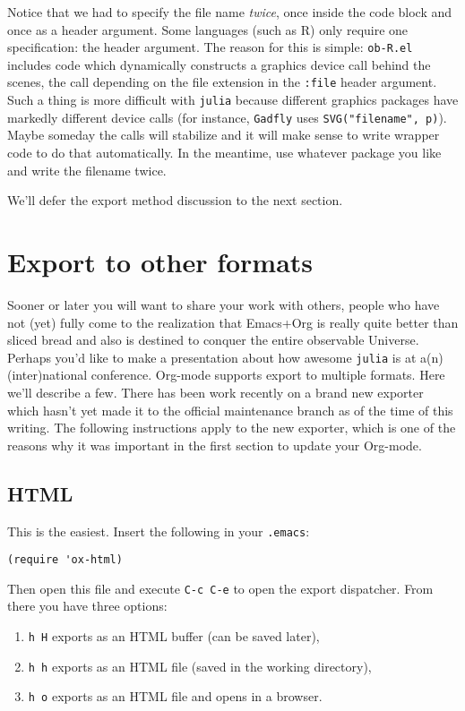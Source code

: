 \documentclass[11pt]{article}
\begin{document}
Notice that we had to specify the file name \emph{twice}, once inside the
code block and once as a header argument.  Some languages (such as R)
only require one specification: the header argument.  The reason for
this is simple: \texttt{ob-R.el} includes code which dynamically constructs a
graphics device call behind the scenes, the call depending on the file
extension in the \texttt{:file} header argument.  Such a thing is more
difficult with \texttt{julia} because different graphics packages have
markedly different device calls (for instance, \texttt{Gadfly} uses
\texttt{SVG("filename", p)}).  Maybe someday the calls will stabilize and it
will make sense to write wrapper code to do that automatically.  In
the meantime, use whatever package you like and write the filename
twice.

We'll defer the export method discussion to the next section.
\section[Export to other formats]{Export to other formats}
\label{sec-4}

Sooner or later you will want to share your work with others, people
who have not (yet) fully come to the realization that Emacs+Org is
really quite better than sliced bread and also is destined to conquer
the entire observable Universe.  Perhaps you'd like to make a
presentation about how awesome \texttt{julia} is at a(n) (inter)national
conference. Org-mode supports export to multiple formats.  Here we'll
describe a few.  There has been work recently on a brand new exporter
which hasn't yet made it to the official maintenance branch as of the
time of this writing.  The following instructions apply to the new
exporter, which is one of the reasons why it was important in the
first section to update your Org-mode.

\subsection[HTML]{HTML}
\label{sec-4-1}
This is the easiest. Insert the following in your \texttt{.emacs}:

\begin{verbatim}
(require 'ox-html)
\end{verbatim}

Then open this file and execute \texttt{C-c C-e} to open the export
dispatcher.  From there you have three options:

\begin{enumerate}
\item \texttt{h H} exports as an HTML buffer (can be saved later),
\item \texttt{h h} exports as an HTML file (saved in the working directory),
\item \texttt{h o} exports as an HTML file and opens in a browser.
\end{enumerate}
\end{document}
